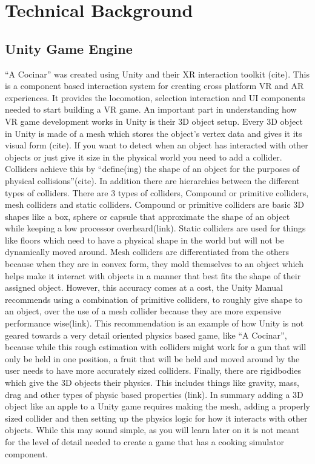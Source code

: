 \documentclass[10pt,twocolumn]{article}
\begin{document}
 

\section{Technical Background}
\subsection{Unity Game Engine}
“A Cocinar” was created using Unity and their XR interaction toolkit (cite). This is a component based interaction system for creating cross platform VR and AR experiences. It provides the locomotion, selection interaction and UI components needed to start building a VR game. An important part in understanding how VR game development works in Unity is their 3D object setup. Every 3D object in Unity is made of a mesh which stores the object's vertex data and gives it its visual form (cite). If you want to detect when an object has interacted with other objects or just give it size in the physical world you need to add a collider. Colliders achieve this by “define(ing) the shape of an object for the purposes of physical collisions”(cite). In addition there are hierarchies between the different types of colliders. There are 3 types of colliders, Compound or primitive colliders, mesh colliders and static colliders. Compound or primitive colliders are basic 3D shapes like a box, sphere or capsule that approximate the shape of an object while keeping a low processor overheard(link). Static colliders are used for things like floors which need to have a physical shape in the world but will not be dynamically moved around. Mesh colliders are differentiated from the others because when they are in convex form, they mold themselves to an object which helps make it interact with objects in a manner that best fits the shape of their assigned object. However, this accuracy comes at a cost, the Unity Manual recommends using a combination of primitive colliders, to roughly give shape to an object, over the use of a mesh collider because they are more expensive performance wise(link). This recommendation is an example of how Unity is not geared towards a very detail oriented physics based game, like “A Cocinar”, because while this rough estimation with colliders might work for a gun that will only be held in one position, a fruit that will be held and moved around by the user needs to have more accurately sized colliders. Finally, there are rigidbodies which give the 3D objects their physics. This includes things like gravity, mass, drag and other types of physic based properties (link). In summary adding a 3D object like an apple to a Unity game requires making the mesh, adding a properly sized collider and then setting up the physics logic for how it interacts with other objects. While this may sound simple, as you will learn later on it is not meant for the level of detail needed to create a game that has a cooking simulator component.
\end{document}
